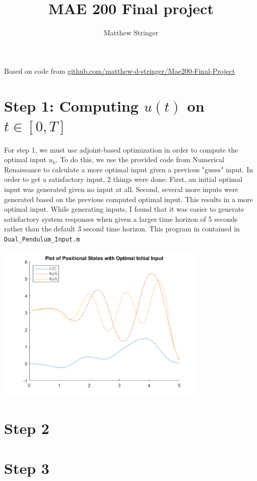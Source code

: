 \documentclass{article}
\title{MAE 200 Final project}
\author{Matthew Stringer}
\date{}
\theoremstyle{definition}
\begin{document}
    \maketitle
    \noindent Based on code from 
    \href{https://github.com/matthew-d-stringer/Mae200-Final-Project}{github.com/matthew-d-stringer/Mae200-Final-Project}

    \section*{Step 1: Computing $u(t)$ on $t \in [0,T]$}
    For step 1, we must use adjoint-based optimization in order to compute
    the optimal input $u_k$. To do this, we use the provided code from 
    Numerical Renaissance to calculate a more optimal input given a previous
    "guess" input. In order to get a satisfactory input, 2 things were done:
    First, an initial optimal input was generated given no input at all.
    Second, several more inputs were generated based on the previous computed
    optimal input.
    This results in a more optimal input.
    While generating inputs, I found that it was easier to generate satisfactory
    system responses when given a larger time horizon of 5 seconds rather than
    the default 3 second time horizon.
    This program in contained in \texttt{Dual\_Pendulum\_Input.m}
    \begin{center}
        \includegraphics*[width=4in]{Matlab Code/Step1_final_plot.png}
    \end{center}

    \section*{Step 2}
    
    \section*{Step 3}
\end{document}
